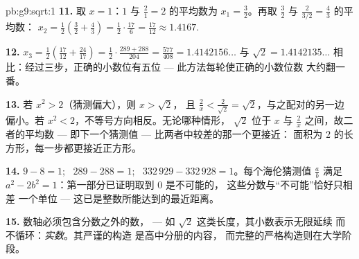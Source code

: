 \begin{solution}{pb:g9:sqrt:1}
\textbf{11.} 取 $x = 1$：$1$ 与 $\frac21 = 2$ 的平均数为
$x_1 = \frac32$。再取 $\frac32$ 与
$\frac{2}{3/2} = \frac43$ 的平均数：
$x_2 = \frac12\left(\frac32 + \frac43\right)
= \frac12 \cdot \frac{17}{6} = \frac{17}{12} \approx 1.4167$.

\textbf{12.} $x_3 = \frac12\left(\frac{17}{12} +
\frac{24}{17}\right) = \frac12 \cdot
\frac{289 + 288}{204} = \frac{577}{408} = 1.4142156\ldots$
与 $\sqrt2 = 1.4142135\ldots$ 相比：经过三步，正确的小数位有五位
--- 此方法每轮使正确的小数位数
大约翻一番。

\textbf{13.} 若 $x^2 > 2$（猜测偏大），则 $x > \sqrt2$，
且 $\frac2x < \frac{2}{\sqrt2} = \sqrt2$，与之配对的另一边
偏小。若 $x^2 < 2$，不等号方向相反。无论哪种情形，
$\sqrt2$ 位于 $x$ 与 $\frac2x$ 之间，故二者的平均数 ---
即下一个猜测值 --- 比两者中较差的那一个更接近：
面积为 $2$ 的长方形，每一步都更接近正方形。

\textbf{14.} $9 - 8 = 1$; \ $289 - 288 = 1$; \
$332\,929 - 332\,928 = 1$。每个海伦猜测值 $\frac ab$
满足 $a^2 - 2b^2 = 1$：第一部分已证明取到 $0$ 是不可能的，
这些分数与“不可能”恰好只相差
一个单位 --- 这已是整数所能达到的最近距离。

\textbf{15.} 数轴必须包含分数之外的数，
--- 如 $\sqrt2$ 这类长度，其小数表示无限延续
而不循环：\emph{实数}。其严谨的构造
是高中分册的内容，
而完整的严格构造则在大学阶段。
\end{solution}
